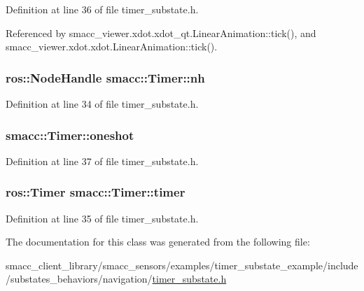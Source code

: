 Definition at line 36 of file timer\+\_\+substate.\+h.



Referenced by smacc\+\_\+viewer.\+xdot.\+xdot\+\_\+qt.\+Linear\+Animation\+::tick(), and smacc\+\_\+viewer.\+xdot.\+xdot.\+Linear\+Animation\+::tick().

\subsubsection[{\texorpdfstring{nh}{nh}}]{\setlength{\rightskip}{0pt plus 5cm}ros\+::\+Node\+Handle smacc\+::\+Timer\+::nh}\hypertarget{classsmacc_1_1Timer_a84b2854ae319292c9351325d98615a66}{}\label{classsmacc_1_1Timer_a84b2854ae319292c9351325d98615a66}


Definition at line 34 of file timer\+\_\+substate.\+h.

\subsubsection[{\texorpdfstring{oneshot}{oneshot}}]{ smacc\+::\+Timer\+::oneshot}\hypertarget{classsmacc_1_1Timer_a8b460b006b7173f718dfa5868c0eb59d}{}\label{classsmacc_1_1Timer_a8b460b006b7173f718dfa5868c0eb59d}


Definition at line 37 of file timer\+\_\+substate.\+h.

\subsubsection[{\texorpdfstring{timer}{timer}}]{\setlength{\rightskip}{0pt plus 5cm}ros\+::\+Timer smacc\+::\+Timer\+::timer}\hypertarget{classsmacc_1_1Timer_a1376795baefaab38614fc108aeb4f36c}{}\label{classsmacc_1_1Timer_a1376795baefaab38614fc108aeb4f36c}


Definition at line 35 of file timer\+\_\+substate.\+h.



The documentation for this class was generated from the following file\+:\begin{DoxyCompactItemize}
\item 
smacc\+\_\+client\+\_\+library/smacc\+\_\+sensors/examples/timer\+\_\+substate\+\_\+example/include/substates\+\_\+behaviors/navigation/\hyperlink{timer__substate_8h}{timer\+\_\+substate.\+h}\end{DoxyCompactItemize}
